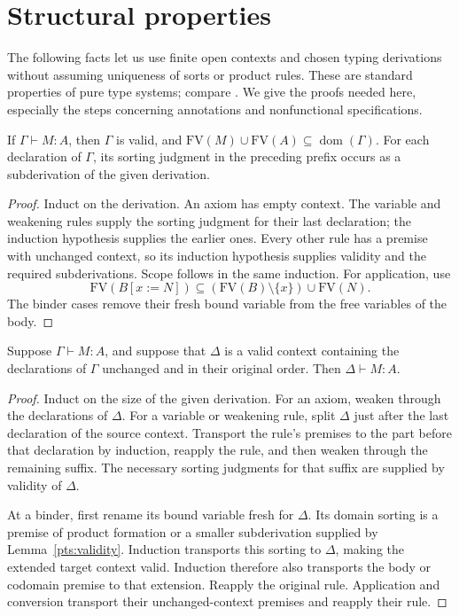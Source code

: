 
\section{Structural properties}\label{pts:metatheory}

The following facts let us use finite open contexts and chosen typing
derivations without assuming uniqueness of sorts or product rules.
These are standard properties of pure type systems; compare
\cite[Chapter~2]{Poll1994}. We give the proofs needed here, especially the
steps concerning annotations and nonfunctional specifications.

\begin{lemma}\label{pts:validity}
If $\Gamma\vdash M:A$, then $\Gamma$ is valid, and
$\mathrm{FV}(M)\cup\mathrm{FV}(A)\subseteq\operatorname{dom}(\Gamma)$.
For each declaration of $\Gamma$, its sorting judgment in the preceding
prefix occurs as a subderivation of the given derivation.
\end{lemma}

\begin{proof}
Induct on the derivation. An axiom has empty context. The variable and
weakening rules supply the sorting judgment for their last declaration;
the induction hypothesis supplies the earlier ones. Every other rule
has a premise with unchanged context, so its induction hypothesis
supplies validity and the required subderivations. Scope follows in the
same induction. For application, use
\[
 \mathrm{FV}(B[x:=N])\subseteq
       (\mathrm{FV}(B)\setminus\{x\})\cup\mathrm{FV}(N).
\]
The binder cases remove their fresh bound variable from the free
variables of the body.
\end{proof}

\begin{lemma}\label{pts:thinning}
Suppose $\Gamma\vdash M:A$, and suppose that $\Delta$ is a valid context
containing the declarations of $\Gamma$ unchanged and in their original
order. Then $\Delta\vdash M:A$.
\end{lemma}

\begin{proof}
Induct on the size of the given derivation. For an axiom, weaken through
the declarations of $\Delta$. For a variable or weakening rule, split
$\Delta$ just after the last declaration of the source context.
Transport the rule's premises to the part before that declaration by
induction, reapply the rule, and then weaken through the remaining
suffix. The necessary sorting judgments for that suffix are supplied
by validity of $\Delta$.

At a binder, first rename its bound variable fresh for $\Delta$.
Its domain sorting is a premise of product formation or a smaller
subderivation supplied by Lemma~\ref{pts:validity}. Induction transports
this sorting to $\Delta$, making the extended target context valid.
Induction therefore also transports the body or codomain premise to
that extension. Reapply the original rule. Application and conversion
transport their unchanged-context premises and reapply their rule.
\end{proof}

